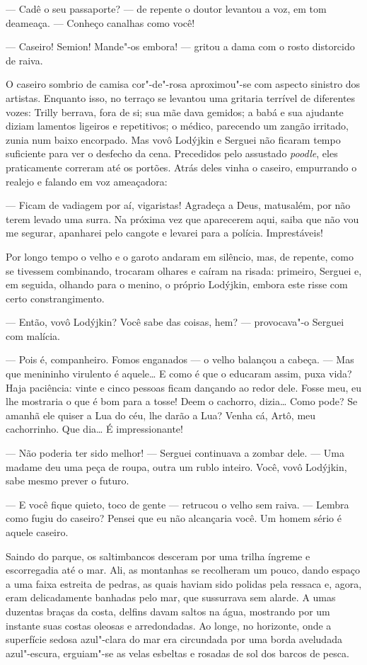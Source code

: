--- Cadê o seu passaporte? --- de repente o doutor levantou a voz, em
tom deameaça. --- Conheço canalhas como você!

--- Caseiro! Semion! Mande"-os embora! --- gritou a dama com o rosto
distorcido de raiva.

O caseiro sombrio de camisa cor"-de"-rosa aproximou"-se com aspecto
sinistro dos artistas. Enquanto isso, no terraço se levantou uma
gritaria terrível de diferentes vozes: Trilly berrava, fora de si; sua
mãe dava gemidos; a babá e sua ajudante diziam lamentos ligeiros e
repetitivos; o médico, parecendo um zangão irritado, zunia num baixo
encorpado. Mas vovô Lodýjkin e Serguei não ficaram tempo suficiente para
ver o desfecho da cena. Precedidos pelo assustado \emph{poodle}, eles
praticamente correram até os portões. Atrás deles vinha o caseiro,
empurrando o realejo e falando em voz ameaçadora:

--- Ficam de vadiagem por aí, vigaristas! Agradeça a Deus, matusalém,
por não terem levado uma surra. Na próxima vez que aparecerem aqui,
saiba que não vou me segurar, apanharei pelo cangote e levarei para a
polícia. Imprestáveis!

Por longo tempo o velho e o garoto andaram em silêncio, mas, de
repente, como se tivessem combinando, trocaram olhares e caíram na
risada: primeiro, Serguei e, em seguida, olhando para o menino, o
próprio Lodýjkin, embora este risse com certo constrangimento.

--- Então, vovô Lodýjkin? Você sabe das coisas, hem? --- provocava"-o
Serguei com malícia.

--- Pois é, companheiro. Fomos enganados --- o velho balançou a cabeça.
--- Mas que menininho virulento é aquele\ldots{} E como é que o educaram
assim, puxa vida? Haja paciência: vinte e cinco pessoas ficam dançando
ao redor dele. Fosse meu, eu lhe mostraria o que é bom para a tosse!
Deem o cachorro, dizia\ldots{} Como pode? Se amanhã ele quiser a Lua do céu,
lhe darão a Lua? Venha cá, Artô, meu cachorrinho. Que dia\ldots{} É
impressionante!

--- Não poderia ter sido melhor! --- Serguei continuava a zombar dele.
--- Uma madame deu uma peça de roupa, outra um rublo inteiro. Você, vovô
Lodýjkin, sabe mesmo prever o futuro.

--- E você fique quieto, toco de gente --- retrucou o velho sem raiva.
--- Lembra como fugiu do caseiro? Pensei que eu não alcançaria você. Um
homem sério é aquele caseiro.

Saindo do parque, os saltimbancos desceram por uma trilha íngreme e
escorregadia até o mar. Ali, as montanhas se recolheram um pouco, dando
espaço a uma faixa estreita de pedras, as quais haviam sido polidas pela
ressaca e, agora, eram delicadamente banhadas pelo mar, que sussurrava
sem alarde. A umas duzentas braças da costa, delfins davam saltos na
água, mostrando por um instante suas costas oleosas e arredondadas. Ao
longe, no horizonte, onde a superfície sedosa azul"-clara do mar era
circundada por uma borda aveludada azul"-escura, erguiam"-se as velas
esbeltas e rosadas de sol dos barcos de pesca.

